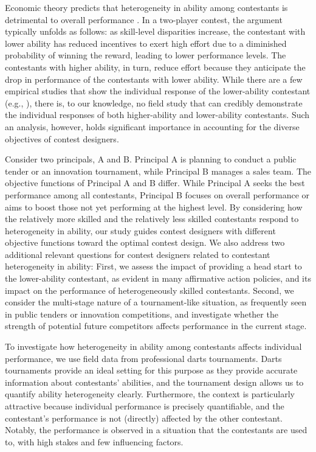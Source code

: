 \documentclass[11pt,a4paper]{article}
\begin{document}
Economic theory predicts that heterogeneity in ability among contestants is detrimental to overall performance \cite{Rosen.1986}. In a two-player contest, the argument typically unfolds as follows: as skill-level disparities increase, the contestant with lower ability has reduced incentives to exert high effort due to a diminished probability of winning the reward, leading to lower performance levels. 
The contestants with higher ability, in turn, reduce effort because they anticipate the drop in performance of the contestants with lower ability.
While there are a few empirical studies that show the individual response of the lower-ability contestant (e.g., ), there is, to our knowledge, no field study that can credibly demonstrate the individual responses of both higher-ability and lower-ability contestants. Such an analysis, however, holds significant importance in accounting for the diverse objectives of contest designers.\par

Consider two principals, A and B. Principal A is planning to conduct a public tender or an innovation tournament, while Principal B manages a sales team. The objective functions of Principal A and B differ. While Principal A seeks the best performance among all contestants, Principal B focuses on overall performance or aims to boost those not yet performing at the highest level. By considering how the relatively more skilled and the relatively less skilled contestants respond to heterogeneity in ability, our study guides contest designers with different objective functions toward the optimal contest design. We also address two additional relevant questions for contest designers related to contestant heterogeneity in ability: First, we assess the impact of providing a head start to the lower-ability contestant, as evident in many affirmative action policies, and its impact on the performance of heterogeneously skilled contestants. Second, we consider the multi-stage nature of a tournament-like situation, as frequently seen in public tenders or innovation competitions, and investigate whether the strength of potential future competitors affects performance in the current stage.\par

To investigate how heterogeneity in ability among contestants affects individual performance, we use field data from professional darts tournaments.
Darts tournaments provide an ideal setting for this purpose as they provide accurate information about contestants' abilities, and the tournament design allows us to quantify ability heterogeneity clearly. Furthermore, the context is particularly attractive because individual performance is precisely quantifiable, and the contestant's performance is not (directly) affected by the other contestant. Notably, the performance is observed in a situation that the contestants are used to, with high stakes and few influencing factors.\par
\end{document}
